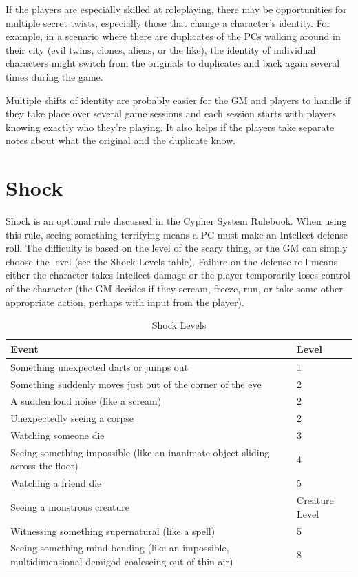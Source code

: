 \begin{multicols}{2}
If the players are especially skilled at roleplaying, there may be opportunities for multiple secret twists, especially those that change a character’s identity. For example, in a scenario where there are duplicates of the PCs walking around in their city (evil twins, clones, aliens, or the like), the identity of individual characters might switch from the originals to duplicates and back again several times during the game.

Multiple shifts of identity are probably easier for the GM and players to handle if they take place over several game sessions and each session starts with players knowing exactly who they’re playing. It also helps if the players take separate notes about what the original and the duplicate know.

\section{Shock}

Shock is an optional rule discussed in the Cypher System Rulebook. When using this rule, seeing something terrifying means a PC must make an Intellect defense roll. The difficulty is based on the level of the scary thing, or the GM can simply choose the level (see the Shock Levels table). Failure on the defense roll means either the character takes Intellect damage or the player temporarily loses control of the character (the GM decides if they scream, freeze, run, or take some other appropriate action, perhaps with input from the player).

\end{multicols}

\begin{table}[h]
\centering 
\caption{Shock Levels}
\label{tab:Shock Levels}

\begin{tabularx}{\textwidth}{| Y | Y |}
\hline


\textbf{Event} & \textbf{Level} \\ \hline
Something unexpected darts or jumps out & 1  \\ \hline
Something suddenly moves just out of the corner of the eye & 2 \\ \hline
A sudden loud noise (like a scream) & 2 \\ \hline
Unexpectedly seeing a corpse & 2 \\ \hline
Watching someone die & 3 \\ \hline
Seeing something impossible (like an inanimate object sliding across the floor) & 4 \\ \hline
Watching a friend die & 5 \\ \hline
Seeing a monstrous creature & Creature Level \\ \hline
Witnessing something supernatural (like a spell) & 5 \\ \hline
Seeing something mind-bending (like an impossible, multidimensional demigod coalescing out of thin air) & 8 \\ \hline

\end{tabularx}
\end{table}

